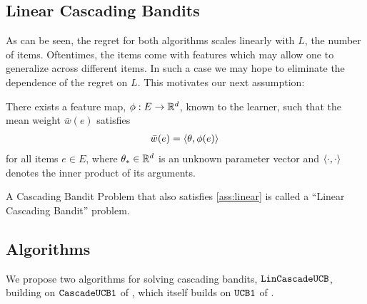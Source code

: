 \subsection{Linear Cascading Bandits}
As can be seen, the regret for both algorithms scales linearly with $L$, the number of items.
Oftentimes, the items come with features which may allow one to generalize across different items.
In such a case we may hope to eliminate the dependence of the regret on $L$.
This motivates our next assumption:
\begin{assumption}
\label{ass:linear} 
There exists a feature map, $\phi:E \to \mathbb{R}^d$, known to the learner, such that 
the mean weight $\bar{w}(e)$ satisfies
\begin{align*}
  \bar{w}(e) = \langle \theta, \phi(e) \rangle\,
\end{align*}
for all items $e\in E$, where $\theta_*\in \mathbb{R}^d$ is an unknown parameter vector
and $\langle \cdot,\cdot \rangle$ denotes the inner product of its arguments. 
\end{assumption}
A Cascading Bandit Problem that also satisfies \cref{ass:linear} is called a ``Linear Cascading Bandit'' problem.

\subsection{Algorithms}
\label{sec:algorithms}

We propose two algorithms for solving cascading bandits, ${\tt LinCascadeUCB}$, building on ${\tt CascadeUCB1}$ of 
  \citet{kveton15cascade}, which itself builds on ${\tt UCB1}$ of \cite{auer02finitetime}.

